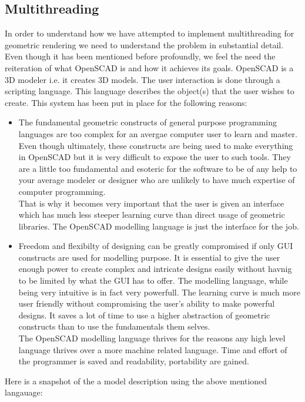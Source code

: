 \subsection{Multithreading}
In order to understand how we have attempted to implement multithreading for geometric rendering we need to understand the problem in substantial detail.\\
Even though it has been mentioned before profoundly, we feel the need the reiteration of what OpenSCAD is and how it achieves its goals. OpenSCAD is a 3D modeler i.e. it creates 3D models. The user interaction is done through a scripting language. This language describes the object(s) that the user wishes to create. This system has been put in place for the following reasons:
\begin{itemize}
	\item The fundamental geometric constructs of general purpose programming languages are too complex for an avergae computer user to learn and master. Even though ultimately, these constructs are being used to make everything in OpenSCAD but it is very difficult to expose the user to such tools. They are a little too fundamental and esoteric for the software to be of any help to your average modeler or designer who are unlikely to have much expertise of computer programming.\\
	That is why it becomes very important that the user is given an interface which has much less steeper learning curve than direct usage of geometric libraries. The OpenSCAD modelling language is just the interface for the job.
	\item Freedom and flexibilty of designing can be greatly compromised if only GUI constructs are used for modelling purpose. It is essential to give the user enough power to create complex and intricate designs easily without havnig to be limited by what the GUI has to offer. The modelling language, while being very intuitive is in fact very powerfull. The learning curve is much more user friendly without compromising the user's ability to make powerful designs. It saves a lot of time to use a higher abstraction of geometric constructs than to use the fundamentals them selves.\\
	The OpenSCAD modelling language thrives for the reasons any high level language thrives over a more machine related language. Time and effort of the programmer is saved and readability, portability are gained.
\end{itemize}
Here is a snapshot of the a model description using the above mentioned langauage:
